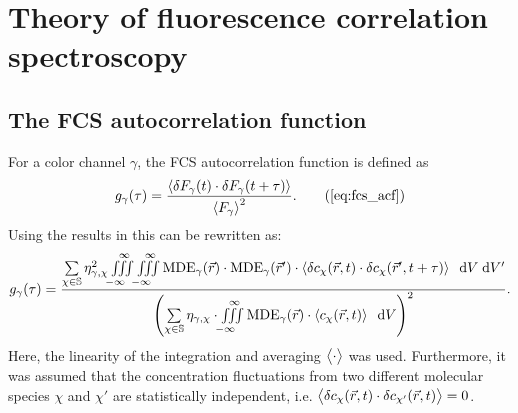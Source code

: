 


\section{Theory of fluorescence correlation spectroscopy}
\label{sec:ConfocalFluorescenceCorrelationSpectroscopy}
\subsection{The FCS autocorrelation function}
\label{sec:TheFCSAutocorrelationFunctionTheory}


\noindent For a color channel $\gamma$, the FCS autocorrelation function is defined as
\begin{equation*}
  g_\gamma(\tau)=\frac{\mean{\delta F_\gamma(t)\cdot\delta F_\gamma(t+\tau)}}{\mean{F_\gamma}^2}. \tag{\ref{eq:fcs_acf}}
\end{equation*}
Using the results in  this can be rewritten as:
\begin{equation}\label{eq:fcs_acffull}
  g_\gamma(\tau)=\frac{\sum\limits_{\chi\in\mathbb{S}}\eta_{\gamma,\chi}^2 \iiint\limits_{-\infty\ \ }^{\ \ \infty}\iiint\limits_{-\infty\ \ }^{\ \ \infty}\operatorname{MDE}_\gamma(\vec{r})\cdot\operatorname{MDE}_\gamma(\vec{r}')\cdot\left\langle \delta c_\chi(\vec{r},t)\cdot\delta c_\chi(\vec{r}',t+\tau)\right\rangle\;\;\mathrm{d}V\;\mathrm{d}V' }{\left(\sum\limits_{\chi\in\mathbb{S}}\eta_{\gamma,\chi} \cdot\iiint\limits_{-\infty\ \ }^{\ \ \infty}\operatorname{MDE}_\gamma(\vec{r})\cdot \left\langle c_\chi(\vec{r},t)\right\rangle\;\;\mathrm{d}V\right)^2}.
\end{equation}
Here, the linearity of the integration and averaging $\bigl\langle \cdot\bigr\rangle$ was used. Furthermore, it was assumed that the concentration fluctuations from two different molecular species $\chi$ and $\chi'$ are statistically independent, i.e. $\bigl\langle \delta c_\chi(\vec{r},t)\cdot\delta c_{\chi'}(\vec{r},t)\bigr\rangle=0$.


